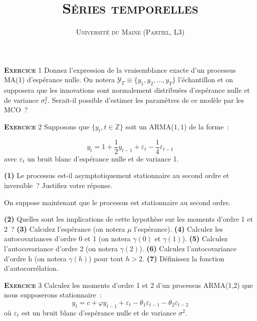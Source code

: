 \documentclass[10pt,a4paper,notitlepage,onecolumn]{article}
\newcommand{\exercice}[1]{\textsc{\textbf{Exercice}} #1}
\newcommand{\question}[1]{\textbf{(#1)}}
\begin{document}
\title{\textsc{Séries temporelles}}
\author{\textsc{Université du Maine (Partiel, L3)}}
\date{}


\maketitle


\exercice{1} Donnez l'expression de la vraisemblance exacte d'un
processus MA(1) d'espérance nulle. On notera $\mathcal Y_T \equiv
\{y_1,y_2,\dots,y_T\}$ l'échantillon et on supposera que les
innovations sont normalement distribuées d'espérance nulle et de
variance $\sigma_{\epsilon}^2$. Serait-il possible d'estimer les
paramètres de ce modèle par les MCO ?

\bigskip
\bigskip

\exercice{2} Supposons que $\{y_t,t\in\mathbb Z\}$ soit un ARMA($1,1$) de la forme :

\[
y_t = 1 + \frac{1}{2}y_{t-1} + \varepsilon_t - \frac{1}{4} \varepsilon_{t-1}
\]
avec $\varepsilon_t$ un bruit blanc d'espérance nulle et de variance 1.\newline

\question{1}   Le    processus   est-il   asymptotiquement
stationnaire  au   second  ordre   et  inversible~?   Justifiez  votre
réponse.\newline

On suppose maintenant que le processus est stationnaire au second
ordre.\newline

\question{2} Quelles sont les implications de cette hypothèse sur les
moments d'ordre 1 et 2 ? \question{3} Calculez l'espérance (on notera
$\mu$ l'espérance). \question{4} Calculez les autocovariances d'ordre
0 et 1 (on notera $\gamma(0)$ et $\gamma(1)$). \question{5} Calculez
l'autocovariance d'ordre 2 (on notera $\gamma(2)$). \question{6}
Calculez l'autocovariance d'ordre h (on notera $\gamma(h)$) pour tout
$h>2$.  \question{7} Définissez la fonction d'autocorrélation.

\bigskip
\bigskip

\exercice{3} Calculez les moments d'ordre 1 et 2 d'un processus ARMA(1,2) que nous supposerons stationnaire :
\[
y_t = c + \varphi y_{t-1} + \varepsilon_t - \theta_1 \varepsilon_{t-1} - \theta_2 \varepsilon_{t-2}
\]
où $\varepsilon_t$ est un bruit blanc d'espérance nulle et de variance $\sigma^2$.
\end{document}

